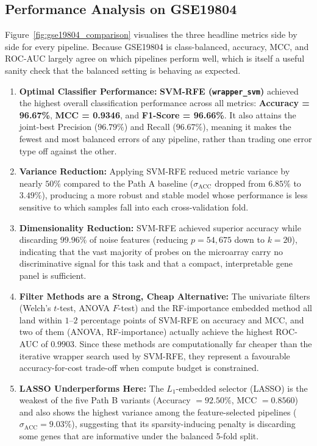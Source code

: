\subsection{Performance Analysis on GSE19804}

Figure~\ref{fig:gse19804_comparison} visualises the three headline metrics side by side for every pipeline. Because GSE19804 is class-balanced, accuracy, MCC, and ROC-AUC largely agree on which pipelines perform well, which is itself a useful sanity check that the balanced setting is behaving as expected.

\begin{enumerate}
    \item \textbf{Optimal Classifier Performance:} \textbf{SVM-RFE (\texttt{wrapper\_svm})} achieved the highest overall classification performance across all metrics: \textbf{Accuracy = 96.67\%}, \textbf{MCC = 0.9346}, and \textbf{F1-Score = 96.66\%}. It also attains the joint-best Precision ($96.79\%$) and Recall ($96.67\%$), meaning it makes the fewest and most balanced errors of any pipeline, rather than trading one error type off against the other.
    \item \textbf{Variance Reduction:} Applying SVM-RFE reduced metric variance by nearly $50\%$ compared to the Path A baseline ($\sigma_{\text{ACC}}$ dropped from $6.85\%$ to $3.49\%$), producing a more robust and stable model whose performance is less sensitive to which samples fall into each cross-validation fold.
    \item \textbf{Dimensionality Reduction:} SVM-RFE achieved superior accuracy while discarding $99.96\%$ of noise features (reducing $p = 54{,}675$ down to $k = 20$), indicating that the vast majority of probes on the microarray carry no discriminative signal for this task and that a compact, interpretable gene panel is sufficient.
    \item \textbf{Filter Methods are a Strong, Cheap Alternative:} The univariate filters (Welch's $t$-test, ANOVA $F$-test) and the RF-importance embedded method all land within $1$--$2$ percentage points of SVM-RFE on accuracy and MCC, and two of them (ANOVA, RF-importance) actually achieve the highest ROC-AUC of $0.9903$. Since these methods are computationally far cheaper than the iterative wrapper search used by SVM-RFE, they represent a favourable accuracy-for-cost trade-off when compute budget is constrained.
    \item \textbf{LASSO Underperforms Here:} The $L_1$-embedded selector (LASSO) is the weakest of the five Path B variants (Accuracy $= 92.50\%$, MCC $= 0.8560$) and also shows the highest variance among the feature-selected pipelines ($\sigma_{\text{ACC}} = 9.03\%$), suggesting that its sparsity-inducing penalty is discarding some genes that are informative under the balanced 5-fold split.
\end{enumerate}

